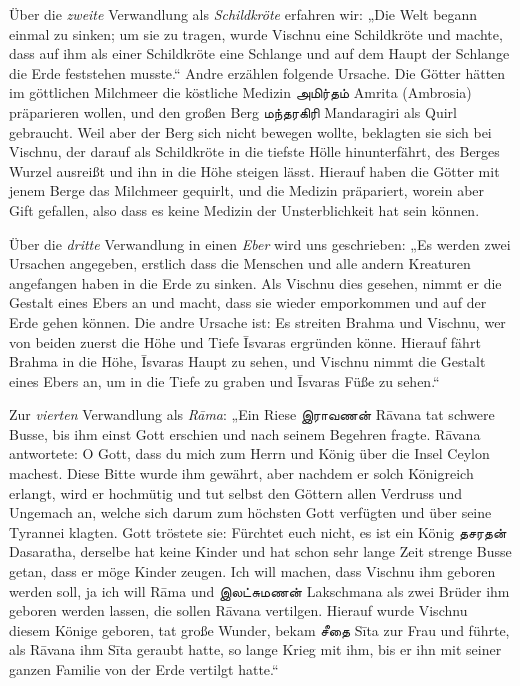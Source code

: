 \documentclass{article}
\newcommand{\TamilText}[1]{\texttamil{#1}}
\newcommand{\tam}[1]{\TamilText{#1}}
\begin{document}
Über die \emph{zweite} Verwandlung als \emph{Schildkröte} erfahren wir: „Die Welt begann einmal zu sinken; um sie zu tragen, wurde Vischnu eine Schildkröte und machte, dass auf ihm als einer Schildkröte eine Schlange und auf dem Haupt der Schlange die Erde feststehen musste.“ Andre erzählen folgende Ursache. Die Götter hätten im göttlichen Milchmeer die köstliche Medizin \tam{அமிர்தம்} Amrita (Ambrosia) präparieren wollen, und den großen Berg \tam{மந்தரகிரி} Mandaragiri als Quirl gebraucht. Weil aber der Berg sich nicht bewegen wollte, beklagten sie sich bei Vischnu, der darauf als Schildkröte in die tiefste Hölle hinunterfährt, des Berges Wurzel ausreißt und ihn in die Höhe steigen lässt. Hierauf haben die Götter mit jenem Berge das Milchmeer gequirlt, und die Medizin präpariert, worein aber Gift gefallen, also dass es keine Medizin der Unsterblichkeit hat sein können.

Über die \emph{dritte} Verwandlung in einen \emph{Eber} wird uns geschrieben: „Es werden zwei Ursachen angegeben, erstlich dass die Menschen und alle andern Kreaturen angefangen haben in die Erde zu sinken. Als Vischnu dies gesehen, nimmt er die Gestalt eines Ebers an und macht, dass sie wieder emporkommen und auf der Erde gehen können. Die andre Ursache ist: Es streiten Brahma und Vischnu, wer von beiden zuerst die Höhe und Tiefe \={I}svaras ergründen könne. Hierauf fährt Brahma in die Höhe, \={I}svaras Haupt zu sehen, und Vischnu nimmt die Gestalt eines Ebers an, um in die Tiefe zu graben und \={I}svaras Füße zu sehen.“

Zur \emph{vierten} Verwandlung als \emph{R\={a}ma}: „Ein Riese \tam{இராவணன்} R\={a}vana tat schwere Busse, bis ihm einst Gott erschien und nach seinem Begehren fragte. R\={a}vana antwortete: O Gott, dass du mich zum Herrn und König über die Insel Ceylon machest. Diese Bitte wurde ihm gewährt, aber nachdem er solch Königreich erlangt, wird er hochmütig und tut selbst den Göttern allen Verdruss und Ungemach an, welche sich darum zum höchsten Gott verfügten und über seine Tyrannei klagten. Gott tröstete sie: Fürchtet euch nicht, es ist ein König \tam{தசரதன்} Dasaratha, derselbe hat keine Kinder und hat schon sehr lange Zeit strenge Busse getan, dass er möge Kinder zeugen. Ich will machen, dass Vischnu ihm geboren werden soll, ja ich will R\={a}ma und \tam{இலட்சுமணன்} Lakschmana als zwei Brüder ihm geboren werden lassen, die sollen R\={a}vana vertilgen. Hierauf wurde Vischnu diesem Könige geboren, tat große Wunder, bekam \tam{சீதை} S\={i}ta zur Frau und führte, als R\={a}vana ihm S\={i}ta geraubt hatte, so lange Krieg mit ihm, bis er ihn mit seiner ganzen Familie von der Erde vertilgt hatte.“
\end{document}
